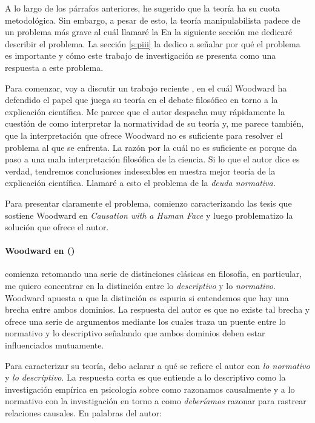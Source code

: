 A lo largo de los párrafos anteriores, he sugerido que la
teoría ha  su cuota metodológica. Sin embargo, a
pesar de esto, la teoría manipulabilista padece de un
problema más grave al cuál llamaré la 
En la siguiente sección me dedicaré describir el problema.
La sección \ref{s:piii} la dedico a señalar por qué el
problema es importante y cómo este trabajo de investigación
se presenta como una respuesta a este problema. 

Para comenzar, voy a discutir un trabajo reciente
, en el cuál Woodward ha defendido el
papel que juega su teoría en el debate filosófico en torno a
la explicación científica. Me parece que el autor despacha
muy rápidamente la cuestión de como interpretar la
normatividad de su teoría y, me parece también, que la
interpretación que ofrece Woodward no es suficiente para
resolver el problema al que se enfrenta. La razón por la
cuál no es suficiente es porque da paso a una mala
interpretación filosófica de la ciencia. Si lo que el autor
dice es verdad, tendremos conclusiones indeseables en
nuestra mejor teoría de la explicación científica. Llamaré a
esto el problema de la \emph{deuda normativa.}

Para presentar claramente el problema, comienzo
caracterizando las tesis que sostiene Woodward en
\emph{Causation with a Human Face} y luego problematizo la
solución que ofrece el autor. 

\paragraph{Woodward en (\citeyear{caushuman})} comienza
retomando una serie de distinciones clásicas en filosofía,
en particular, me quiero concentrar en la distinción entre
lo \emph{descriptivo} y lo \emph{normativo}. Woodward
apuesta a que la distinción es espuria si entendemos que hay
una brecha entre ambos dominios. La respuesta del autor es
que no existe tal brecha y ofrece una serie de argumentos
mediante los cuales traza un puente entre lo normativo y lo
descriptivo señalando que ambos dominios deben estar
influenciados mutuamente.

Para caracterizar su teoría, debo aclarar a qué se refiere
el autor con \emph{lo normativo} y \emph{lo descriptivo}. La
respuesta corta es que entiende a lo descriptivo como la
investigación empírica en psicología sobre como razonamos
causalmente y a lo normativo con la investigación en torno a
como \emph{deberíamos} razonar para rastrear relaciones
causales. En palabras del autor:

